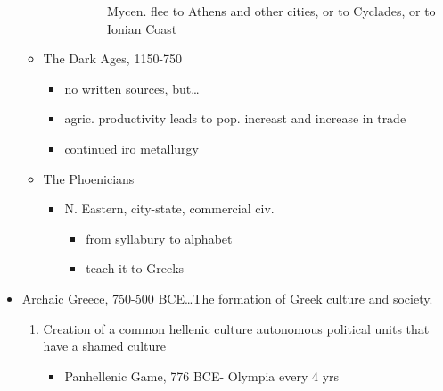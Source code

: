 \documentclass[11pt, a4paper]{article}
\begin{document}
\begin{itemize}
\begin{itemize}
\begin{itemize}
\begin{itemize}
\begin{enumerate}
                    Mycen. flee to Athens and other cities, or to Cyclades, or to Ionian Coast
                \end{enumerate}
            \end{itemize}
        \end{itemize}
      \item The Dark Ages, 1150-750
        \begin{itemize}
          \item no written sources, but\dots
          \item agric. productivity leads to pop. increast and increase in trade
          \item continued iro metallurgy
        \end{itemize}
      \item The Phoenicians
        \begin{itemize}
          \item N. Eastern, city-state, commercial civ.
            \begin{itemize}
              \item from syllabury to alphabet
              \item teach it to Greeks
            \end{itemize}
        \end{itemize}
    \end{itemize}
  \item Archaic Greece, 750-500 BCE\dots The formation of Greek culture and society.
    \begin{enumerate}
      \item Creation of a common hellenic culture autonomous political units that have
        a shamed culture
        \begin{itemize}
          \item Panhellenic Game, 776 BCE- Olympia every 4 yrs
        \end{itemize}
    \end{enumerate}
\end{itemize}
\end{document}
